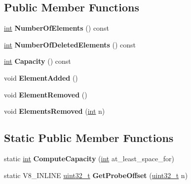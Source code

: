 \subsection*{Public Member Functions}
\begin{DoxyCompactItemize}
\item 
\mbox{\label{classv8_1_1internal_1_1HashTableBase_a28b2b49a3a7435c69e8618c366b0b972}} 
\mbox{\hyperlink{classint}{int}} {\bfseries Number\+Of\+Elements} () const
\item 
\mbox{\label{classv8_1_1internal_1_1HashTableBase_a6f100c15dbdc0e98e88f8c0ccabe58ab}} 
\mbox{\hyperlink{classint}{int}} {\bfseries Number\+Of\+Deleted\+Elements} () const
\item 
\mbox{\label{classv8_1_1internal_1_1HashTableBase_abf32dc092786ef9b61128331c884c0d0}} 
\mbox{\hyperlink{classint}{int}} {\bfseries Capacity} () const
\item 
\mbox{\label{classv8_1_1internal_1_1HashTableBase_a9c26053696a9507a6548c562de31896e}} 
void {\bfseries Element\+Added} ()
\item 
\mbox{\label{classv8_1_1internal_1_1HashTableBase_a60cec5ab24abcb14a08c59e6abf33aaf}} 
void {\bfseries Element\+Removed} ()
\item 
\mbox{\label{classv8_1_1internal_1_1HashTableBase_a0f5cbf8c5beece520200339ea79521c4}} 
void {\bfseries Elements\+Removed} (\mbox{\hyperlink{classint}{int}} n)
\end{DoxyCompactItemize}
\subsection*{Static Public Member Functions}
\begin{DoxyCompactItemize}
\item 
\mbox{\label{classv8_1_1internal_1_1HashTableBase_abc79b7681516b408f235db11d181d158}} 
static \mbox{\hyperlink{classint}{int}} {\bfseries Compute\+Capacity} (\mbox{\hyperlink{classint}{int}} at\+\_\+least\+\_\+space\+\_\+for)
\item 
\mbox{\label{classv8_1_1internal_1_1HashTableBase_a5c0dade921887e7b3f2c76a0c595ced7}} 
static V8\+\_\+\+I\+N\+L\+I\+NE \mbox{\hyperlink{classuint32__t}{uint32\+\_\+t}} {\bfseries Get\+Probe\+Offset} (\mbox{\hyperlink{classuint32__t}{uint32\+\_\+t}} n)
\end{DoxyCompactItemize}
